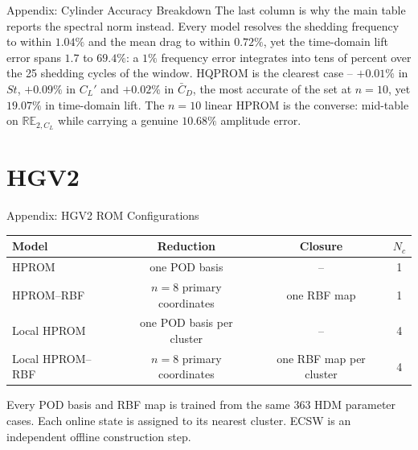 \documentclass[aspectratio=169]{beamer}
\begin{document}
\begin{frame}{Appendix: Cylinder Accuracy Breakdown}
{\tiny The last column is why the main table reports the spectral norm instead. Every model resolves the shedding frequency to within $1.04\%$ and the mean drag to within $0.72\%$, yet the time-domain lift error spans $1.7$ to $69.4\%$: a $1\%$ frequency error integrates into tens of percent over the 25 shedding cycles of the window. HQPROM is the clearest case -- $+0.01\%$ in $St$, $+0.09\%$ in $C_L'$ and $+0.02\%$ in $\bar{C}_D$, the most accurate of the set at $n=10$, yet $19.07\%$ in time-domain lift. The $n=10$ linear HPROM is the converse: mid-table on $\mathbb{RE}_{2,C_L}$ while carrying a genuine $10.68\%$ amplitude error.}
\end{frame}

\section{HGV2}

\begin{frame}{Appendix: HGV2 ROM Configurations}
\centering
\small
\renewcommand{\arraystretch}{1.15}
\begin{tabular}{lccc}
\hline
\textbf{Model} & \textbf{Reduction} & \textbf{Closure} & $N_c$ \\
\hline
HPROM & one POD basis & -- & 1 \\
HPROM--RBF & $n=8$ primary coordinates & one RBF map & 1 \\
\addlinespace[0.35em]
Local HPROM & one POD basis per cluster & -- & 4 \\
Local HPROM--RBF & $n=8$ primary coordinates & one RBF map per cluster & 4 \\
\hline
\end{tabular}

\vspace{0.5em}
{\small Every POD basis and RBF map is trained from the same 363 HDM parameter cases.
Each online state is assigned to its nearest cluster. ECSW is an independent offline
construction step.}
\end{frame}
\end{document}
